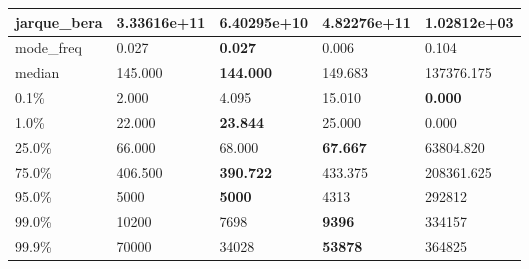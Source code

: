 \begin{table}[H]
\begin{tabular}{|l|m{10em}|m{10em}|m{10em}|m{10em}|}
\hline jarque\_bera & 3.33616e+11 & 6.40295e+10 & \bfseries 4.82276e+11 & \cellcolor[rgb]{0.9, 0.54, 0.52} 1.02812e+03 \\
\hline mode\_freq & 0.027 & \bfseries 0.027 & 0.006 & \cellcolor[rgb]{0.9, 0.54, 0.52} 0.104 \\
\hline median & 145.000 & \bfseries 144.000 & 149.683 & \cellcolor[rgb]{0.9, 0.54, 0.52} 137376.175 \\
\hline 0.1\% & 2.000 & 4.095 & \cellcolor[rgb]{0.9, 0.54, 0.52} 15.010 & \bfseries 0.000 \\
\hline 1.0\% & 22.000 & \bfseries 23.844 & 25.000 & \cellcolor[rgb]{0.9, 0.54, 0.52} 0.000 \\
\hline 25.0\% & 66.000 & 68.000 & \bfseries 67.667 & \cellcolor[rgb]{0.9, 0.54, 0.52} 63804.820 \\
\hline 75.0\% & 406.500 & \bfseries 390.722 & 433.375 & \cellcolor[rgb]{0.9, 0.54, 0.52} 208361.625 \\
\hline 95.0\% & 5000 & \bfseries 5000 & 4313 & \cellcolor[rgb]{0.9, 0.54, 0.52} 292812 \\
\hline 99.0\% & 10200 & 7698 & \bfseries 9396 & \cellcolor[rgb]{0.9, 0.54, 0.52} 334157 \\
\hline 99.9\% & 70000 & 34028 & \bfseries 53878 & \cellcolor[rgb]{0.9, 0.54, 0.52} 364825 \\
\hline
\end{tabular}
\end{table}
